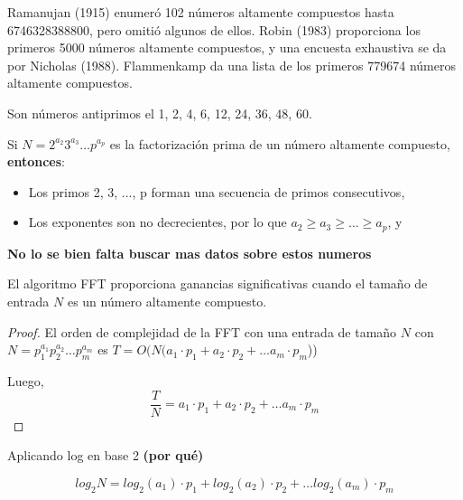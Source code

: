 \noindent Ramanujan (1915) enumeró 102 números altamente compuestos hasta 6746328388800, pero omitió algunos de ellos. Robin (1983) proporciona los primeros 5000 números altamente compuestos, y una encuesta exhaustiva se da por Nicholas (1988). Flammenkamp da una lista de los primeros 779674 números altamente compuestos.

\begin{ejemplo}
Son números antiprimos el 1, 2, 4, 6, 12, 24, 36, 48, 60.
\end{ejemplo}


\begin{proposicion}
  \noindent Si $N = 2^{a_2}3^{a_3} \ldots p^{a_p}$ es la factorización prima de un número altamente compuesto, \textbf{entonces}:
\end{proposicion}

\begin{itemize}
\item Los primos 2, 3, ..., p forman una secuencia de primos consecutivos,

\item Los exponentes son no decrecientes, por lo que \( a_2 \geq a_3 \geq \ldots \geq a_p \), y

\end{itemize}

\textbf{No lo se bien falta buscar mas datos sobre estos numeros}

\begin{proposicion}
    El algoritmo FFT proporciona ganancias significativas cuando el tamaño de entrada $N$ es un número altamente compuesto. 
\end{proposicion}

\begin{proof}
   El orden de complejidad de la FFT con una entrada de tamaño $N$ con  $N = p_1^{a_1}p_2^{a_2} \ldots p_m^{a_m}$ es $T= O(N(a_1\cdot p_1+a_2\cdot p_2+ \ldots a_m\cdot p_m$))

   \noindent Luego, 
    \begin{equation}
        \frac{T}{N} = a_1\cdot p_1+a_2\cdot p_2+ \ldots a_m\cdot p_m
    \end{equation}
\end{proof}

Aplicando log en base 2 \textbf{(por qué)}

\begin{equation}
    log_2N = log_2(a_1)\cdot p_1+log_2(a_2)\cdot p_2+ \ldots log_2(a_m)\cdot p_m
\end{equation}

